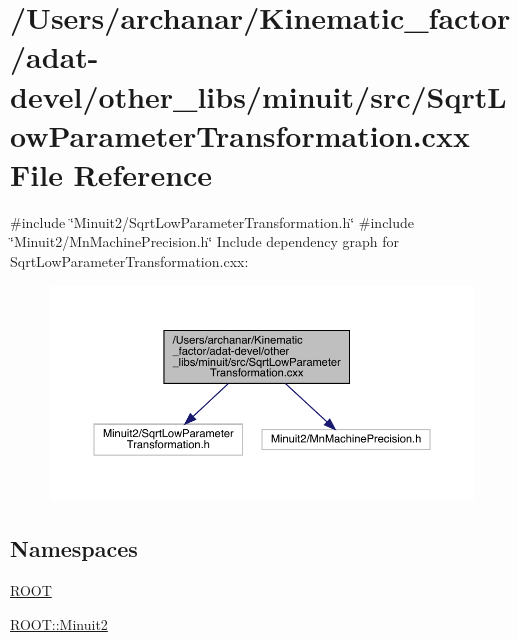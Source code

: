 \hypertarget{adat-devel_2other__libs_2minuit_2src_2SqrtLowParameterTransformation_8cxx}{}\section{/\+Users/archanar/\+Kinematic\+\_\+factor/adat-\/devel/other\+\_\+libs/minuit/src/\+Sqrt\+Low\+Parameter\+Transformation.cxx File Reference}
\label{adat-devel_2other__libs_2minuit_2src_2SqrtLowParameterTransformation_8cxx}
{\ttfamily \#include \char`\"{}Minuit2/\+Sqrt\+Low\+Parameter\+Transformation.\+h\char`\"{}}\newline
{\ttfamily \#include \char`\"{}Minuit2/\+Mn\+Machine\+Precision.\+h\char`\"{}}\newline
Include dependency graph for Sqrt\+Low\+Parameter\+Transformation.\+cxx\+:
\nopagebreak
\begin{figure}[H]
\begin{center}
\leavevmode
\includegraphics[width=350pt]{d6/d41/adat-devel_2other__libs_2minuit_2src_2SqrtLowParameterTransformation_8cxx__incl}
\end{center}
\end{figure}
\subsection*{Namespaces}
\begin{DoxyCompactItemize}
\item 
 \mbox{\hyperlink{namespaceROOT}{R\+O\+OT}}
\item 
 \mbox{\hyperlink{namespaceROOT_1_1Minuit2}{R\+O\+O\+T\+::\+Minuit2}}
\end{DoxyCompactItemize}
